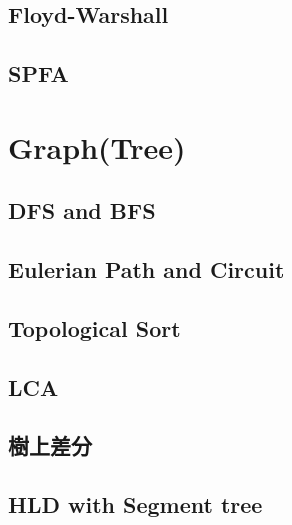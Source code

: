 \subsection{Floyd-Warshall}


%

\subsection{SPFA}


\section{Graph(Tree)}

\subsection{DFS and BFS}


\subsection{Eulerian Path and Circuit}


\subsection{Topological Sort}


\subsection{LCA}


\subsection{樹上差分}


\subsection{HLD with Segment tree}


